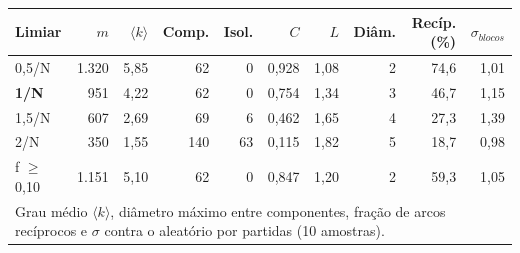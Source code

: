 \begin{tabular}{lrrrrrrrrr}
  \toprule
  Limiar & $m$ & $\langle k\rangle$ & Comp. & Isol. & $C$ & $L$ & Diâm. & Recíp. (\%) & $\sigma_{blocos}$ \\
  \midrule
  0,5/N & 1.320 & 5,85 & 62 & 0 & 0,928 & 1,08 & 2 & 74,6 & 1,01 \\
  \textbf{1/N} & 951 & 4,22 & 62 & 0 & 0,754 & 1,34 & 3 & 46,7 & 1,15 \\
  1,5/N & 607 & 2,69 & 69 & 6 & 0,462 & 1,65 & 4 & 27,3 & 1,39 \\
  2/N & 350 & 1,55 & 140 & 63 & 0,115 & 1,82 & 5 & 18,7 & 0,98 \\
  f $\geq$ 0,10 & 1.151 & 5,10 & 62 & 0 & 0,847 & 1,20 & 2 & 59,3 & 1,05 \\
  \bottomrule
  \multicolumn{10}{l}{\footnotesize Grau médio $\langle k\rangle$, diâmetro máximo entre componentes, fração de arcos recíprocos e $\sigma$ contra o aleatório por partidas (10 amostras).} \\
\end{tabular}
